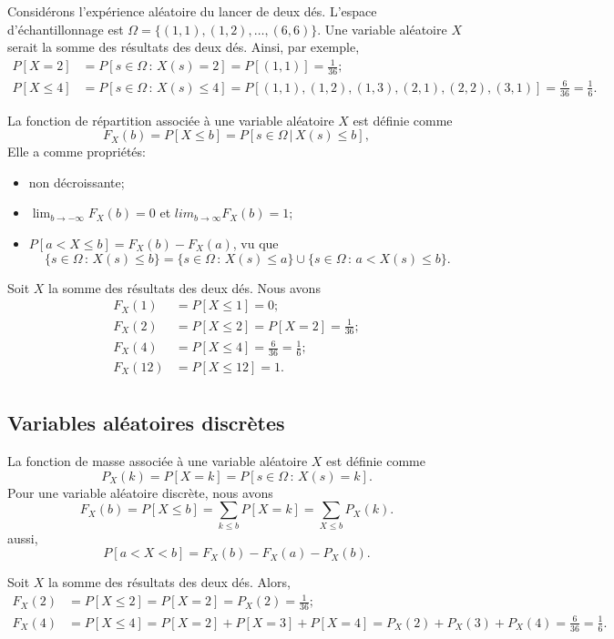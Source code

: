 \begin{example}
Considérons l'expérience aléatoire du lancer de deux dés.
L'espace d'échantillonnage est $\Omega = \lbrace (1,1),(1,2),\ldots,(6,6) \rbrace$.
Une variable aléatoire $X$ serait la somme des résultats des deux dés. Ainsi, par exemple,
\begin{align*}
P[X=2] &= P[s \in \Omega\,:\, X(s)=2] = P[(1,1)] = \frac{1}{36}; \\
P[X \leq 4] &= P[s \in \Omega\,:\, X(s) \leq 4] =
P[(1,1),(1,2),(1,3),(2,1),(2,2),(3,1)] = \frac{6}{36} = \frac{1}{6}.
\end{align*}
\end{example}

La fonction de répartition associée à une variable aléatoire $X$ est définie comme
\[
 F_X(b) = P[X \leq b] = P[s \in \Omega \,|\, X(s) \leq b], 
\]
Elle a comme propriétés:
\begin{itemize}
 \item 
 non décroissante;
 \item
 $\lim_{b \rightarrow -\infty} F_X(b) = 0$ et $lim_{b\rightarrow \infty} F_X(b) = 1$;
 \item
 $P[a < X \leq b] = F_X(b) - F_X(a)$, vu que
 \[
 \lbrace s \in \Omega\,:\, X(s) \leq b \rbrace =
 \lbrace s \in \Omega\,:\,X(s)\leq a \rbrace \cup \lbrace s \in \Omega \,:\, a < X(s) \leq b \rbrace.
 \]
\end{itemize}

\begin{example}
Soit $X$ la somme des résultats des deux dés. Nous avons
\begin{align*}
 F_X(1) &= P[X \leq 1] = 0;\\
 F_X(2) &= P[X \leq 2] = P[X=2] = \frac{1}{36};\\
 F_X(4) &= P[X \leq 4] = \frac{6}{36} = \frac{1}{6};\\
 F_X(12) &= P[X \leq 12] = 1.\\
\end{align*}
\end{example}

\subsection{Variables aléatoires discrètes}

La  fonction de masse associée à une variable aléatoire $X$ est définie comme
\[
P_X(k) = P[X=k] = P[s \in \Omega\,:\, X(s)=k ].
\]
Pour une variable aléatoire discrète, nous avons
\[
F_X(b) = P[X \leq b] = \sum_{k \leq b} P[X=k] = \sum_{X \leq b} P_X(k).
\]
aussi,
\[
P[a<X<b] = F_X(b) - F_X(a) - P_X(b).
\]
\begin{example}
 Soit $X$ la somme des résultats des deux dés. Alors,
\begin{align*}
F_X(2) &= P[X \leq 2] = P[X=2] = P_X(2) = \frac{1}{36}; \\
F_X(4) &= P[X \leq 4] = P[X=2] + P[X=3] + P[X=4] = P_X(2) + P_X(3) + P_X(4) = \frac{6}{36} = \frac{1}{6}.
\end{align*}
\end{example}

